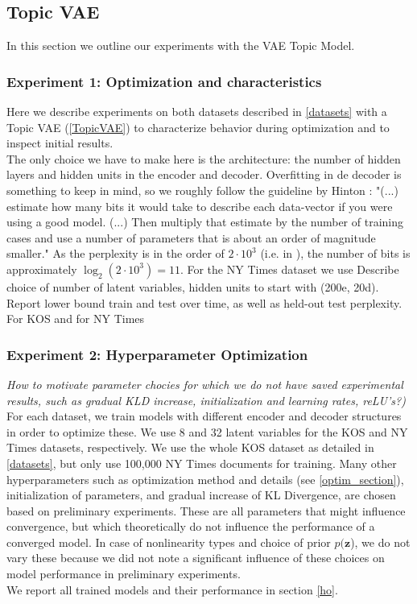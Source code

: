 \documentclass{report}
\begin{document}
	\subsection{Topic VAE}

	In this section we outline our experiments with the VAE Topic Model.  
	
	
	
	\subsubsection{Experiment 1: Optimization and characteristics}
	
	Here we describe experiments on both datasets described in \ref{datasets} with a Topic VAE (\ref{TopicVAE}) to characterize behavior during optimization and to inspect initial results. \\
	The only choice we have to make here is the architecture: the number of hidden layers and hidden units in the encoder and decoder. Overfitting in de decoder is something to keep in mind, so we roughly follow the guideline by Hinton \cite{hinton2012neural}: "(...) estimate how many bits it would take to describe each data-vector if you were using a good model. (...) Then multiply that estimate by the number of training cases and use a number of parameters that is about an order of magnitude smaller." As the perplexity is in the order of $2 \cdot 10^3$ (i.e. in \cite{ranganath2015deep}), the number of bits is approximately $\log_2(2 \cdot 10^3) = 11$. For the NY Times dataset we use  	Describe choice of number of latent variables, hidden units to start with (200e, 20d). Report lower bound train and test over time, as well as held-out test perplexity. For KOS and for NY Times
	
	\subsubsection{Experiment 2: Hyperparameter Optimization}\label{HO_section}
	\textit{How to motivate parameter chocies for which we do not have saved experimental results, such as gradual KLD increase, initialization and learning rates, reLU's?)}
	For each dataset, we train models with different encoder and decoder structures in order to optimize these. We use 8 and 32 latent variables for the KOS and NY Times datasets, respectively. We use the whole KOS dataset as detailed in \ref{datasets}, but only use 100,000 NY Times documents for training. Many other hyperparameters such as optimization method and details (see \ref{optim_section}), initialization of parameters, and gradual increase of KL Divergence, are chosen based on preliminary experiments. These are all parameters that might influence convergence, but which theoretically do not influence the performance of a converged model. In case of nonlinearity types and choice of prior $p(\mathbf{z}$), we do not vary these because we did not note a significant influence of these choices on model performance in preliminary experiments.\\
	We report all trained models and their performance in section \ref{ho}.
	
\end{document}
